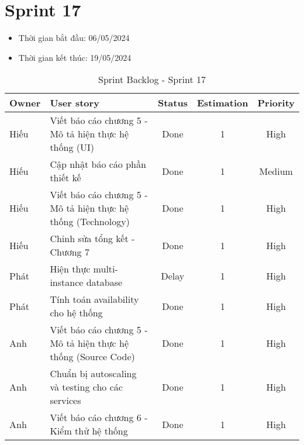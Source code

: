 \section{Sprint 17}
\begin{itemize}
    \item Thời gian bắt đầu: 06/05/2024
    \item Thời gian kết thúc: 19/05/2024
\end{itemize}
\begin{table}[H]
    \begin{tabular}{|m{2.5cm}|m{6cm}|c|c|c|}
    \hline
    \textbf{Owner}  & \textbf{User story}                                & \textbf{Status} & \textbf{Estimation} & \textbf{Priority} \\ \hline
    Hiếu                & Viết báo cáo chương 5 - Mô tả hiện thực hệ thống (UI)                & Done            & 1                   & High         \\ \hline
    Hiếu               & Cập nhật báo cáo phần thiết kế                 & Done            & 1                   & Medium        \\ \hline
    Hiếu                & Viết báo cáo chương 5 - Mô tả hiện thực hệ thống (Technology)                  & Done            & 1                   & High         \\ \hline
    Hiếu               & Chỉnh sửa tổng kết - Chương 7                & Done            & 1                   & High         \\ \hline
    Phát               & Hiện thực multi-instance database                 & Delay            & 1                   & High         \\ \hline
    Phát               & Tính toán availability cho hệ thống                & Done            & 1                   & High         \\ \hline
    Anh               & Viết báo cáo chương 5 - Mô tả hiện thực hệ thống (Source Code)                 & Done            & 1                   & High         \\ \hline
    Anh               & Chuẩn bị autoscaling và testing cho các services                & Done            & 1                   & High         \\ \hline
    Anh               & Viết báo cáo chương 6 - Kiểm thử hệ thống                & Done            & 1                   & High         \\ \hline
    \end{tabular}
    \caption{Sprint Backlog - Sprint 17}
    \label{tab:sprint-17}
\end{table}
